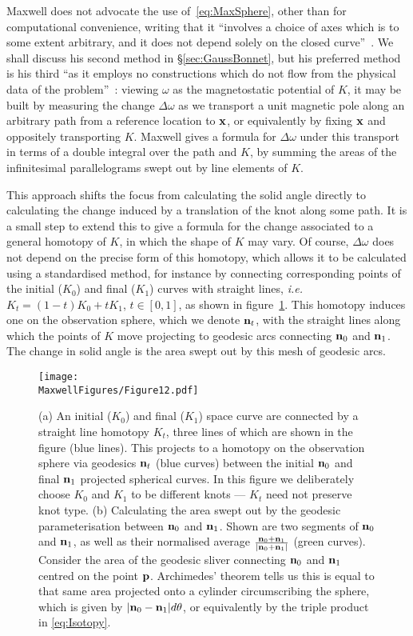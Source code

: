     Maxwell does not advocate the use of~\eqref{eq:MaxSphere}, other than for computational convenience, writing that it ``involves a choice of axes which is to some extent arbitrary, and it does not depend solely on the closed curve''~\citep[Art.~418]{Maxwell2}. We shall discuss his second method in \S\ref{sec:GaussBonnet}, but his preferred method is his third ``as it employs no constructions which do not flow from the physical data of the problem''~\citep[Art.~419]{Maxwell2}: viewing $\omega$ as the magnetostatic potential of $K$, it may be built by measuring the change $\Delta\omega$ as we transport a unit magnetic pole along an arbitrary path from a reference location to ${\bf x}$, or equivalently by fixing ${\bf x}$ and oppositely transporting $K$. Maxwell gives a formula for $\Delta\omega$ under this transport in terms of a double integral over the path and $K$, by summing the areas of the infinitesimal parallelograms swept out by line elements of $K$. 

    This approach shifts the focus from calculating the solid angle directly to calculating the change induced by a translation of the knot along some path. It is a small step to extend this to give a formula for the change associated to a general homotopy of $K$, in which the shape of $K$ may vary. Of course, $\Delta \omega$ does not depend on the precise form of this homotopy, which allows it to be calculated using a standardised method, for instance by connecting corresponding points of the initial ($K_0$) and final ($K_1$) curves with straight lines, {\sl i.e.} $K_t = (1-t) K_0 + t K_1$, $t\in [0,1]$, as shown in figure~\ref{fig:Isotopy}. This homotopy induces one on the observation sphere, which we denote ${\bf n}_t$, with the straight lines along which the points of $K$ move projecting to geodesic arcs connecting ${\bf n}_0$ and ${\bf n}_1$. The change in solid angle is the area swept out by this mesh of geodesic arcs. 
    \begin{figure}[htpb]
        \centering
        \texttt{[image: \\MaxwellFigures/Figure12.pdf]}
        \caption[Curve homotopy and its projection]{(a) An initial ($K_0$) and final ($K_1$) space curve are connected by a straight line homotopy $K_t$, three lines of which are shown in the figure (blue lines). This projects to a homotopy on the observation sphere via geodesics ${\bf n}_t$ (blue curves) between the initial ${\bf n}_0$ and final ${\bf n}_1$ projected spherical curves. In this figure we deliberately choose $K_0$ and $K_1$ to be different knots --- $K_t$ need not preserve knot type. (b) Calculating the area swept out by the geodesic parameterisation between ${\bf n}_0$ and ${\bf n}_1$. Shown are two segments of ${\bf n}_0$ and ${\bf n}_1$, as well as their normalised average $\frac{{\bf n}_0 + {\bf n}_1}{|{\bf n}_0 + {\bf n}_1|}$ (green curves). Consider the area of the geodesic sliver connecting ${\bf n}_0$ and ${\bf n}_1$ centred on the point ${\bf p}$. Archimedes' theorem tells us this is equal to that same area projected onto a cylinder circumscribing the sphere, which is given by ${|{\bf n}_0 - {\bf n}_1|}d\theta$, or equivalently by the triple product in \eqref{eq:Isotopy}. } 
        \label{fig:Isotopy} 
    \end{figure}

